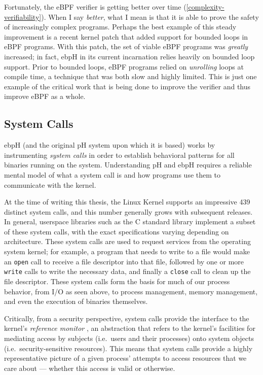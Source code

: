 \documentclass[
  12pt]{findlay}
\newcommand{\passthrough}[1]{#1}
\begin{document}
Fortunately, the eBPF verifier is getting better over time
(\autoref{complexity-verifiability}). When I say \emph{better}, what I
mean is that it is able to prove the safety of increasingly complex
programs. Perhaps the best example of this steady improvement is a
recent kernel patch \autocite{starovoitov19} that added support for
bounded loops in eBPF programs. With this patch, the set of viable eBPF
programs was \emph{greatly} increased; in fact, ebpH in its current
incarnation relies heavily on bounded loop support. Prior to bounded
loops, eBPF programs relied on \emph{unrolling} loops at compile time, a
technique that was both slow and highly limited. This is just one
example of the critical work that is being done to improve the verifier
and thus improve eBPF as a whole.

\hypertarget{system-calls}{%
\subsection{System Calls}\label{system-calls}}

ebpH (and the original pH system upon which it is based) works by
instrumenting \emph{system calls} in order to establish behavioral
patterns for all binaries running on the system. Understanding pH and
ebpH requires a reliable mental model of what a system call is and how
programs use them to communicate with the kernel.

At the time of writing this thesis, the Linux Kernel \autocite{unistd}
supports an impressive 439 distinct system calls, and this number
generally grows with subsequent releases. In general, userspace
libraries such as the C standard library implement a subset of these
system calls, with the exact specifications varying depending on
architecture. These system calls are used to request services from the
operating system kernel; for example, a program that needs to write to a
file would make an \passthrough{\lstinline!open!} call to receive a file
descriptor into that file, followed by one or more
\passthrough{\lstinline!write!} calls to write the necessary data, and
finally a \passthrough{\lstinline!close!} call to clean up the file
descriptor. These system calls form the basis for much of our process
behavior, from I/O as seen above, to process management, memory
management, and even the execution of binaries themselves.

Critically, from a security perspective, system calls provide the
interface to the kernel's \emph{reference monitor}
\autocite{jaeger08,vanoorschot19,anderson72}, an abstraction that refers
to the kernel's facilities for mediating access by subjects (i.e.~users
and their processes) onto system objects (i.e.~security-sensitive
resources). This means that system calls provide a highly representative
picture of a given process' attempts to access resources that we care
about --- whether this access is valid or otherwise.
\end{document}
